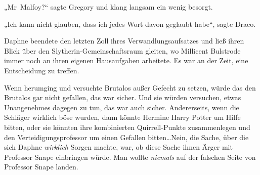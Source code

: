„Mr~Malfoy?“ sagte Gregory und klang langsam ein wenig besorgt.

„Ich kann nicht glauben, dass ich jedes Wort davon geglaubt habe“, sagte Draco.

\later

Daphne beendete den letzten Zoll ihres Verwandlungsaufsatzes und ließ ihren Blick über den Slytherin-Gemeinschaftsraum gleiten, wo Millicent Bulstrode immer noch an ihren eigenen Hausaufgaben arbeitete. Es war an der Zeit, eine Entscheidung zu treffen.

Wenn \SPHEW herumging und versuchte Brutalos außer Gefecht zu setzen, würde das den Brutalos gar nicht gefallen, das war sicher. Und sie würden versuchen, etwas Unangenehmes dagegen zu tun, das war auch sicher. Andererseits, wenn die Schläger wirklich böse wurden, dann könnte Hermine Harry Potter um Hilfe bitten, oder sie könnten ihre kombinierten Quirrell-Punkte zusammenlegen und den Verteidigungsprofessor um einen Gefallen bitten…Nein, die Sache, über die sich Daphne \emph{wirklich} Sorgen machte, war, ob diese Sache ihnen Ärger mit Professor Snape einbringen würde. Man wollte \emph{niemals} auf der falschen Seite von Professor Snape landen.

